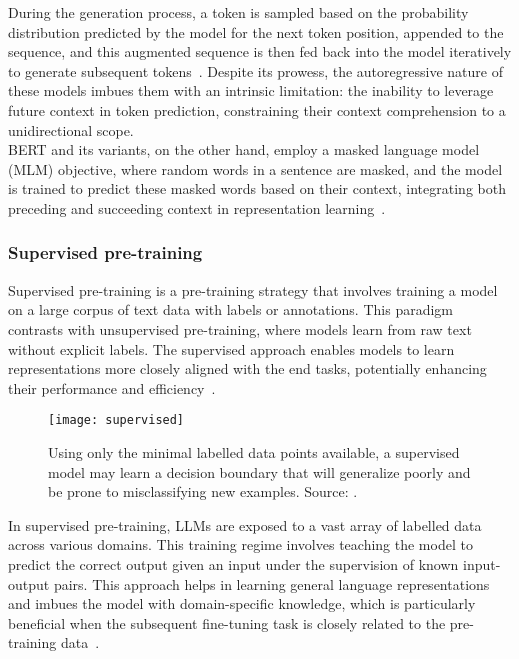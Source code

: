 During the generation process, a token is sampled based on the probability distribution predicted by the model for the next token position, appended to the sequence, and this augmented sequence is then fed back into the model iteratively to generate subsequent tokens~\cite{brown2020language}.
Despite its prowess, the autoregressive nature of these models imbues them with an intrinsic limitation: the inability to leverage future context in token prediction, constraining their context comprehension to a unidirectional scope.\\
BERT and its variants, on the other hand, employ a masked language model (MLM) objective, where random words in a sentence are masked, and the model is trained to predict these masked words based on their context, integrating both preceding and succeeding context in representation learning~\cite{devlin2019bert}.


\subsubsection{Supervised pre-training}
\label{subsubsec:supervised-pre-training}

Supervised pre-training is a pre-training strategy that involves training a model on a large corpus of text data with labels or annotations.
This paradigm contrasts with unsupervised pre-training, where models learn from raw text without explicit labels.
The supervised approach enables models to learn representations more closely aligned with the end tasks, potentially enhancing their performance and efficiency~\cite{gururangan2020don}.

\begin{figure}[h]
	\centering
	\texttt{[image: supervised]}
	\caption{Using only the minimal labelled data points available, a supervised model may learn a decision boundary that will generalize poorly and be prone to misclassifying new examples. Source: \textcite{bergmann2023semi}.}
	\label{fig:supervised}
\end{figure}

In supervised pre-training, LLMs are exposed to a vast array of labelled data across various domains.
This training regime involves teaching the model to predict the correct output given an input under the supervision of known input-output pairs.
This approach helps in learning general language representations and imbues the model with domain-specific knowledge, which is particularly beneficial when the subsequent fine-tuning task is closely related to the pre-training data~\cite{phang2019sentence}.

